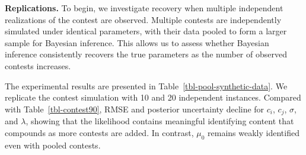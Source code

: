 \documentclass[mnsc]{informs3}
\begin{document}
\textbf{Replications.}
To begin, we investigate recovery when multiple independent realizations of the contest are observed.
Multiple contests are independently simulated under identical parameters, with their data pooled to form a larger sample for Bayesian inference.
This allows us to assess whether Bayesian inference consistently recovers the true parameters as the number of observed contests increases.

The experimental results are presented in Table~\ref{tbl-pool-synthetic-data}.
We replicate the contest simulation with 10 and 20 independent instances.
Compared with Table~\ref{tbl-contest90}, RMSE and posterior uncertainty decline for $c_i$, $c_j$, $\sigma$, and $\lambda$, showing that the likelihood contains meaningful identifying content that compounds as more contests are added.
In contrast, $\mu_0$ remains weakly identified even with pooled contests.
\end{document}
